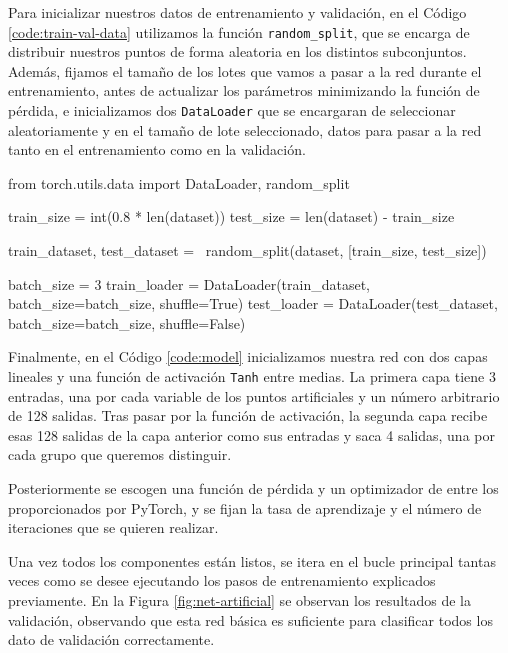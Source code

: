 Para inicializar nuestros datos de entrenamiento y validación, en el Código \ref{code:train-val-data} utilizamos la función \texttt{random\_split}, que se encarga de distribuir nuestros puntos de forma aleatoria en los distintos subconjuntos. Además, fijamos el tamaño de los lotes que vamos a pasar a la red durante el entrenamiento, antes de actualizar los parámetros minimizando la función de pérdida, e inicializamos dos \texttt{DataLoader} que se encargaran de seleccionar aleatoriamente y en el tamaño de lote seleccionado, datos para pasar a la red tanto en el entrenamiento como en la validación.

\begin{mypython}[float={h}, caption={Inicialización de los conjuntos de entrenamiento y validación.}, label={code:train-val-data}]
from torch.utils.data import DataLoader, random_split

train_size = int(0.8 * len(dataset))
test_size = len(dataset) - train_size 

train_dataset, test_dataset = \
  random_split(dataset, [train_size, test_size])

batch_size = 3
train_loader = DataLoader(train_dataset,
                          batch_size=batch_size,
                          shuffle=True)
test_loader = DataLoader(test_dataset,
                         batch_size=batch_size, 
                         shuffle=False)
\end{mypython}

Finalmente, en el Código \ref{code:model} inicializamos nuestra red con dos capas lineales y una función de activación \texttt{Tanh} entre medias. La primera capa tiene 3 entradas, una por cada variable de los puntos artificiales y un número arbitrario de 128 salidas. Tras pasar por la función de activación, la segunda capa recibe esas 128 salidas de la capa anterior como sus entradas y saca 4 salidas, una por cada grupo que queremos distinguir.

Posteriormente se escogen una función de pérdida y un optimizador de entre los proporcionados por PyTorch, y se fijan la tasa de aprendizaje y el número de iteraciones que se quieren realizar.

Una vez todos los componentes están listos, se itera en el bucle principal tantas veces como se desee ejecutando los pasos de entrenamiento explicados previamente. En la Figura \ref{fig:net-artificial} se observan los resultados de la validación, observando que esta red básica es suficiente para clasificar todos los dato de validación correctamente.

